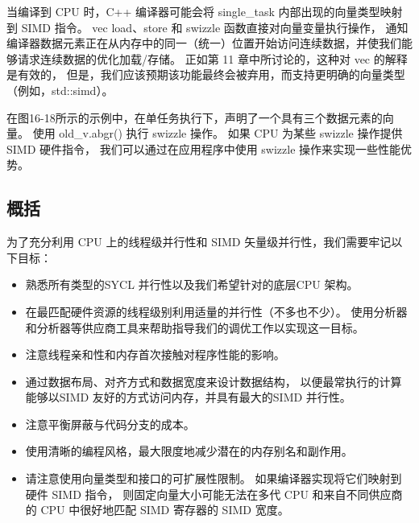 当编译到 CPU 时，C++ 编译器可能会将 single\_task 内部出现的向量类型映射到 SIMD 指令。 
vec load、store 和 swizzle 函数直接对向量变量执行操作，
通知编译器数据元素正在从内存中的同一（统一）位置开始访问连续数据，并使我们能够请求连续数据的优化加载/存储。 
正如第 11 章中所讨论的，这种对 vec 的解释是有效的，
但是，我们应该预期该功能最终会被弃用，而支持更明确的向量类型（例如，std::simd）。

在图16-18所示的示例中，在单任务执行下，声明了一个具有三个数据元素的向量。 
使用 old\_v.abgr() 执行 swizzle 操作。 如果 CPU 为某些 swizzle 操作提供 SIMD 硬件指令，
我们可以通过在应用程序中使用 swizzle 操作来实现一些性能优势。

\subsection{概括}
为了充分利用 CPU 上的线程级并行性和 SIMD 矢量级并行性，我们需要牢记以下目标：

\begin{itemize}
	\item 熟悉所有类型的SYCL 并行性以及我们希望针对的底层CPU 架构。

	\item 在最匹配硬件资源的线程级别利用适量的并行性（不多也不少）。 
	使用分析器和分析器等供应商工具来帮助指导我们的调优工作以实现这一目标。

	\item 注意线程亲和性和内存首次接触对程序性能的影响。

	\item 通过数据布局、对齐方式和数据宽度来设计数据结构，
	以便最常执行的计算能够以SIMD 友好的方式访问内存，并具有最大的SIMD 并行性。

	\item 注意平衡屏蔽与代码分支的成本。

	\item 使用清晰的编程风格，最大限度地减少潜在的内存别名和副作用。

	\item 请注意使用向量类型和接口的可扩展性限制。 
	如果编译器实现将它们映射到硬件 SIMD 指令，
	则固定向量大小可能无法在多代 CPU 和来自不同供应商的 CPU 中很好地匹配 SIMD 寄存器的 SIMD 宽度。
\end{itemize}
